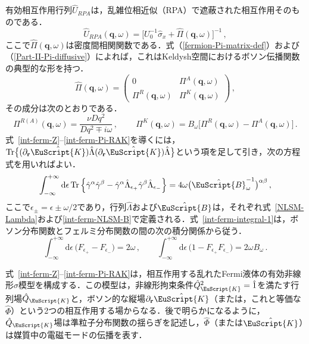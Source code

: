 \documentclass[a4paper,11pt]{ltjsarticle}
\def\Tr{\mathrm{Tr}}
\def\d{\mathrm{d}}
\def\qo{(\mathbf{q},\omega)}
\def\Qk{\hat{Q}_{\EuScript{K}}}
\begin{document}
有効相互作用行列$\hat{U}_{RPA}$は，乱雑位相近似（RPA）で遮蔽された相互作用そのものである．
\begin{equation}\label{int-ferm-U-RPA}
\hat{U}_{RPA}\qo=\big[U^{-1}_{0}\hat{\sigma}_{x}+\hat{\Pi}\qo\big]^{-1}\,,
\end{equation}
ここで$\hat{\Pi}\qo$は密度間相関関数である．式（\ref{fermion-Pi-matrix-def}）および（\ref{Part-II-Pi-diffusive}）によれば，これはKeldysh空間におけるボソン伝播関数の典型的な形を持つ．
\begin{equation}\label{int-ferm-Pi-matrix}
\hat{\Pi}\qo=\left(\begin{array}{cc}0& \Pi^{A}\qo \\
\Pi^{R}\qo & \Pi^{K}\qo\end{array}\right)\,,
\end{equation}
その成分は次のとおりである．
\begin{equation}\label{int-ferm-Pi-RAK}
\Pi^{R(A)}\qo=\frac{\nu Dq^{2}}{Dq^{2}\mp i\omega}\,,\,
\qquad\Pi^{K}\qo=B_{\omega}\big[\Pi^{R}\qo-\Pi^{A}\qo\big]\,.
\end{equation}
式~\eqref{int-ferm-Z}--\eqref{int-ferm-Pi-RAK}を導くには，$\Tr\big\{(\partial_{\mathbf{r}}\hat{\EuScript{K}})\hat{\Lambda}
(\partial_{\mathbf{r}}\hat{\EuScript{K}})\hat{\Lambda}\big\}$という項を足して引き，次の方程式を用いればよい．
\begin{equation}\label{int-ferm-integral-1}
\int^{+\infty}_{-\infty}\d\epsilon\,\Tr\left\{\hat{\gamma}^{\alpha}
\hat{\gamma}^{\beta}-
\hat{\gamma}^{\alpha}\hat{\Lambda}_{\epsilon_{+}}
\hat{\gamma}^{\beta}\hat{\Lambda}_{\epsilon_{-}}\right\}=
4\omega\big(\hat{\EuScript{B}}^{-1}_{\omega}\big)^{\alpha\beta}\,,
\end{equation}
ここで$\epsilon_{\pm}=\epsilon\pm\omega/2$であり，行列$\hat{\Lambda}$および$\hat{\EuScript{B}}$は，それぞれ式~\eqref{NLSM-Lambda}および\eqref{int-ferm-NLSM-B}で定義される．式~\eqref{int-ferm-integral-1}は，ボソン分布関数とフェルミ分布関数の間の次の積分関係から従う．
\begin{equation}\label{int-ferm-integral-2}
\int^{+\infty}_{-\infty}\d\epsilon\,\big(F_{\epsilon_{+}}-F_{\epsilon_{-}}\big)=2\omega\,,\qquad
\int^{+\infty}_{-\infty}\d\epsilon\,\big(1-F_{\epsilon_{+}}F_{\epsilon_{-}}\big)=2\omega
B_{\omega}\,.
\end{equation}

式~\eqref{int-ferm-Z}--\eqref{int-ferm-Pi-RAK}は，相互作用する乱れたFermi液体の有効非線形$\sigma$模型を構成する．この模型は，非線形拘束条件$\Qk^{2}=\hat{1}$を満たす行列場$\Qk$と，ボソン的な縦場$\partial_{\mathbf{r}}\hat{\EuScript{K}}$（または，これと等価な$\hat{\Phi}$）という2つの相互作用する場からなる．後で明らかになるように，$\Qk$場は準粒子分布関数の揺らぎを記述し，$\hat{\Phi}$（または$\hat{\EuScript{K}}$）は媒質中の電磁モードの伝播を表す．
\end{document}
